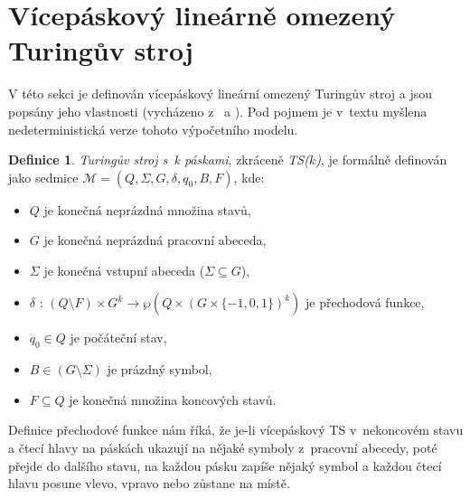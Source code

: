 \documentclass[thesis=B,czech]{FITthesis}[2019/12/23]
\theoremstyle{definition}
\newtheorem{definition}{Definice}[chapter]
\begin{document}
\section{Vícepáskový lineárně omezený Turingův stroj}\label{sec:turmac}

V této sekci je definován vícepáskový lineární omezený Turingův stroj a jsou popsány jeho vlastnosti (vycházeno z~\cite{hopcroft} a \cite{sestakova}).
Pod pojmem  je v~textu myšlena nedeterministická verze tohoto výpočetního modelu.  

\begin{definition}
\emph{Turingův stroj s~k páskami}, zkráceně \emph{TS($k$)}, je formálně definován jako sedmice $\mathcal{M} = \left(Q, \Sigma, G, \delta, q_0, B, F\right)$, kde:
\begin{itemize}
	\item{$Q$ je konečná neprázdná množina stavů,}
	\item{$G$ je konečná neprázdná pracovní abeceda,}
	\item{$\Sigma$ je konečná vstupní abeceda ($\Sigma \subseteq G$),}
	\item{$\delta$ : $\left(Q \setminus F\right) \times  G^k \rightarrow \wp\left( Q\times \left(G \times \{-1, 0, 1\}\right)^k \right)$ je přechodová funkce,}
	\item{$q_0 \in Q$ je počáteční stav,}
	\item{$B \in \left(G\setminus\Sigma\right)$ je prázdný symbol,}
	\item{$F \subseteq Q$ je konečná množina koncových stavů.}
\end{itemize}
\end{definition}
Definice přechodové funkce nám říká, že je-li vícepáskový TS v~nekoncovém stavu a čtecí hlavy na páskách ukazují na nějaké symboly z~pracovní abecedy, poté přejde do dalšího stavu, na každou pásku zapíše nějaký symbol a každou čtecí hlavu posune vlevo, vpravo nebo zůstane na místě.
\end{document}
